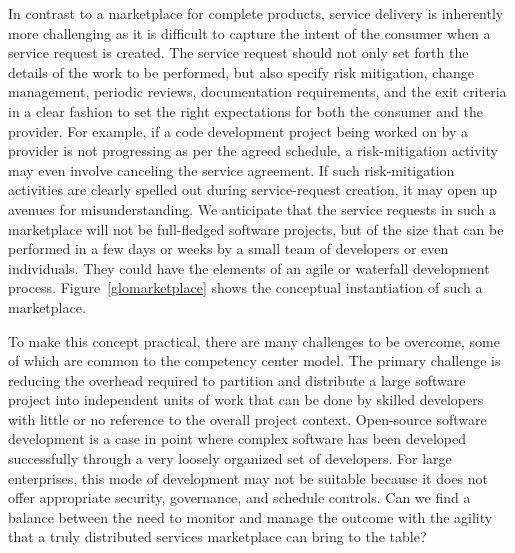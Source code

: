 In contrast to a marketplace for complete products, service delivery is
inherently more challenging as it is difficult to capture the intent of the
consumer when a service request is created. The service request should not only
set forth the details of the work to be performed, but also specify risk
mitigation, change management, periodic reviews, documentation requirements, and
the exit criteria in a clear fashion to set the right expectations for both the
consumer and the provider.  For example, if a code development project being
worked on by a provider is not progressing as per the agreed schedule, a
risk-mitigation activity may even involve canceling the service agreement. If
such risk-mitigation activities are clearly spelled out during service-request
creation, it may open up avenues for misunderstanding. We anticipate that the
service requests in such a marketplace will not be full-fledged software
projects, but of the size that can be performed in a few days or weeks by a
small team of developers or even individuals. They could have the elements of an
agile or waterfall development process. Figure~\ref{glomarketplace} shows the
conceptual instantiation of such a marketplace.

To make this concept practical, there are many challenges to be overcome, some
of which are common to the competency center model. The primary challenge is
reducing the overhead required to partition and distribute a large software
project into independent units of work that can be done by skilled developers
with little or no reference to the overall project context. Open-source software
development is a case in point where complex software has been developed
successfully through a very loosely organized set of developers. For large
enterprises, this mode of development may not be suitable because it does not
offer appropriate security, governance, and schedule controls. Can we find a
balance between the need to monitor and manage the outcome with the agility that
a truly distributed services marketplace can bring to the table?

